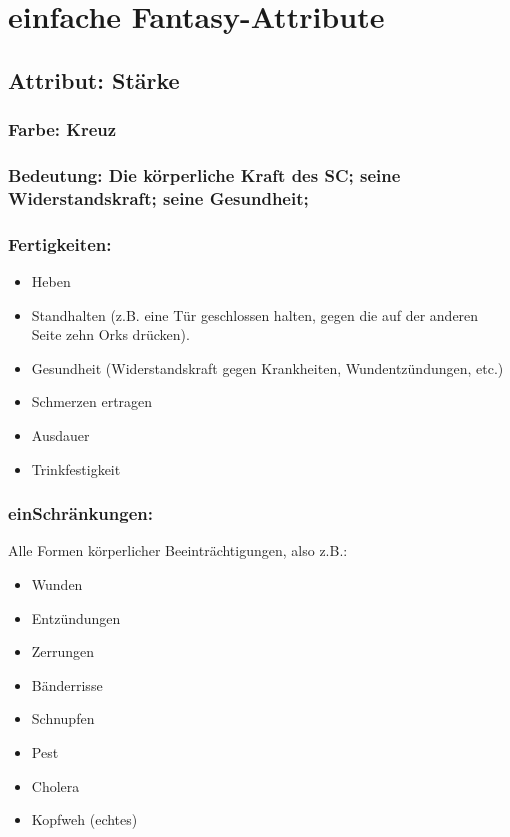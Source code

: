 \section{einfache Fantasy-Attribute}
\label{sect:einfacheFantasyAttribute}
\subsection{Attribut: Stärke}

\subsubsection{Farbe: Kreuz}

\subsubsection{Bedeutung: Die körperliche Kraft des SC; seine Widerstandskraft; seine Gesundheit;}

\subsubsection{Fertigkeiten:}
\begin{itemize}
\item Heben
\item Standhalten (z.B. eine Tür geschlossen halten, gegen die auf der anderen Seite zehn Orks drücken).
\item Gesundheit (Widerstandskraft gegen Krankheiten, Wundentzündungen, etc.)
\item Schmerzen ertragen
\item Ausdauer
\item Trinkfestigkeit
\end{itemize}

\subsubsection{einSchränkungen:}

Alle Formen körperlicher Beeinträchtigungen, also z.B.:
\begin{itemize}
\item Wunden
\item Entzündungen
\item Zerrungen
\item Bänderrisse
\item Schnupfen
\item Pest
\item Cholera
\item Kopfweh (echtes)
\end{itemize}

